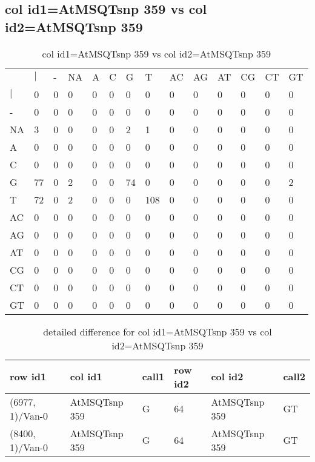\subsection{col id1=AtMSQTsnp 359 vs col id2=AtMSQTsnp 359}
\begin{center}
\begin{longtable}{|l|l|l|l|l|l|l|l|l|l|l|l|l|l|}
\caption{col id1=AtMSQTsnp 359 vs col id2=AtMSQTsnp 359} \label{table_dm880}\\
\hline
\\
\hline
&$|$&-&NA&A&C&G&T&AC&AG&AT&CG&CT&GT\\
$|$&0&0&0&0&0&0&0&0&0&0&0&0&0\\
-&0&0&0&0&0&0&0&0&0&0&0&0&0\\
NA&3&0&0&0&0&2&1&0&0&0&0&0&0\\
A&0&0&0&0&0&0&0&0&0&0&0&0&0\\
C&0&0&0&0&0&0&0&0&0&0&0&0&0\\
G&77&0&2&0&0&74&0&0&0&0&0&0&2\\
T&72&0&2&0&0&0&108&0&0&0&0&0&0\\
AC&0&0&0&0&0&0&0&0&0&0&0&0&0\\
AG&0&0&0&0&0&0&0&0&0&0&0&0&0\\
AT&0&0&0&0&0&0&0&0&0&0&0&0&0\\
CG&0&0&0&0&0&0&0&0&0&0&0&0&0\\
CT&0&0&0&0&0&0&0&0&0&0&0&0&0\\
GT&0&0&0&0&0&0&0&0&0&0&0&0&0\\
\hline
\end{longtable}
\end{center}

\begin{center}
\begin{longtable}{|l|l|l|l|l|l|}
\caption{detailed difference for col id1=AtMSQTsnp 359 vs col id2=AtMSQTsnp 359} \label{table_dm881}\\
\hline
row id1&col id1&call1&row id2&col id2&call2\\
\hline
(6977, 1)/Van-0&AtMSQTsnp 359&G&64&AtMSQTsnp 359&GT\\
(8400, 1)/Van-0&AtMSQTsnp 359&G&64&AtMSQTsnp 359&GT\\
\hline
\end{longtable}
\end{center}

